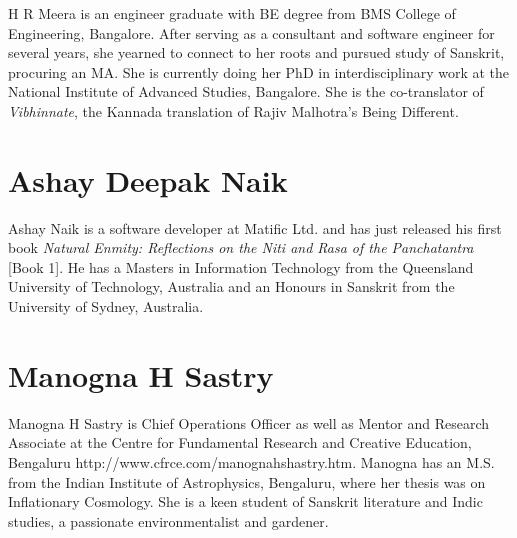 H R Meera is an engineer graduate with BE degree from BMS College of Engineering, Bangalore. After serving as a consultant and software engineer for several years, she yearned to connect to her roots and pursued study of Sanskrit, procuring an MA. She is currently doing her PhD in interdisciplinary work at the National Institute of Advanced Studies, Bangalore. She is the co-translator of {\sl Vibhinnate}, the Kannada translation of Rajiv Malhotra’s Being Different.

\section*{Ashay Deepak Naik}

Ashay Naik is a software developer at Matific Ltd. and has just released his first book {\sl Natural Enmity: Reflections on the Niti and Rasa of the Panchatantra} [Book 1]. He has a Masters in Information Technology from the Queensland University of Technology, Australia and an Honours in Sanskrit from the University of Sydney, Australia.

\section*{Manogna H Sastry}

Manogna H Sastry is Chief Operations Officer as well as Mentor and Research Associate at the Centre for Fundamental Research and Creative Education, Bengaluru http://www.cfrce.com/manognahshastry.htm. Manogna has an M.S. from the Indian Institute of Astrophysics, Bengaluru, where her thesis was on Inflationary Cosmology. She is a keen student of Sanskrit literature and Indic studies, a passionate environmentalist and gardener.
